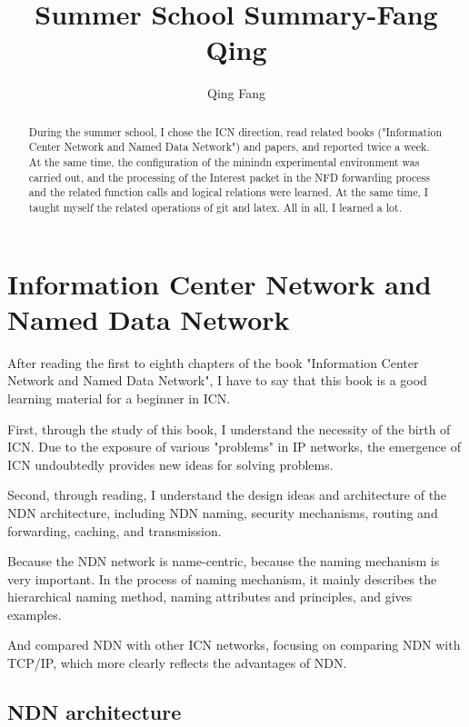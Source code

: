 \documentclass[conference]{IEEEtran}
\begin{document}
\title{Summer School Summary-Fang Qing}

\author{Qing Fang}

\maketitle

\begin{abstract}
    During the summer school, I chose the ICN direction, 
    read related books ("Information Center Network and Named Data Network") and papers, 
    and reported twice a week. 
    At the same time, the configuration of the minindn experimental environment was carried out, 
    and the processing of the Interest packet in the NFD forwarding process 
    and the related function calls and logical relations were learned. 
    At the same time, I taught myself the related operations of git and latex. All in all, I learned a lot.
\end{abstract}


\section{Information Center Network and Named Data Network}
After reading the first to eighth chapters of the book "Information Center Network and Named Data Network", I have to say that this book is a good learning material for a beginner in ICN.


First, through the study of this book, I understand the necessity of the birth of ICN. Due to the exposure of various "problems" in IP networks, the emergence of ICN undoubtedly provides new ideas for solving problems.


Second, through reading, I understand the design ideas and architecture of the NDN architecture, including NDN naming, security mechanisms, routing and forwarding, caching, and transmission.


Because the NDN network is name-centric, because the naming mechanism is very important. In the process of naming mechanism, it mainly describes the hierarchical naming method, naming attributes and principles, and gives examples.


And compared NDN with other ICN networks, focusing on comparing NDN with TCP/IP, which more clearly reflects the advantages of NDN.


\subsection{NDN architecture}
\end{document}
